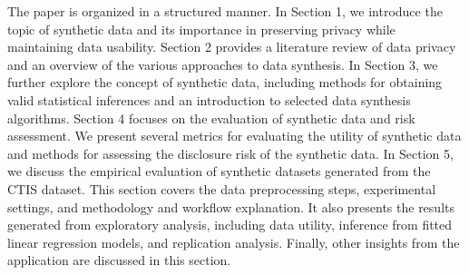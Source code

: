 The paper is organized in a structured manner. In Section 1, we introduce the topic of synthetic data and its importance in preserving privacy while maintaining data usability. Section 2 provides a literature review of data privacy and an overview of the various approaches to data synthesis. In Section 3, we further explore the concept of synthetic data, including methods for obtaining valid statistical inferences and an introduction to selected data synthesis algorithms. Section 4 focuses on the evaluation of synthetic data and risk assessment. We present several metrics for evaluating the utility of synthetic data and methods for assessing the disclosure risk of the synthetic data. In Section 5, we discuss the empirical evaluation of synthetic datasets generated from the CTIS dataset. This section covers the data preprocessing steps, experimental settings, and methodology and workflow explanation. It also presents the results generated from exploratory analysis, including data utility, inference from fitted linear regression models, and replication analysis. Finally, other insights from the application are discussed in this section.




